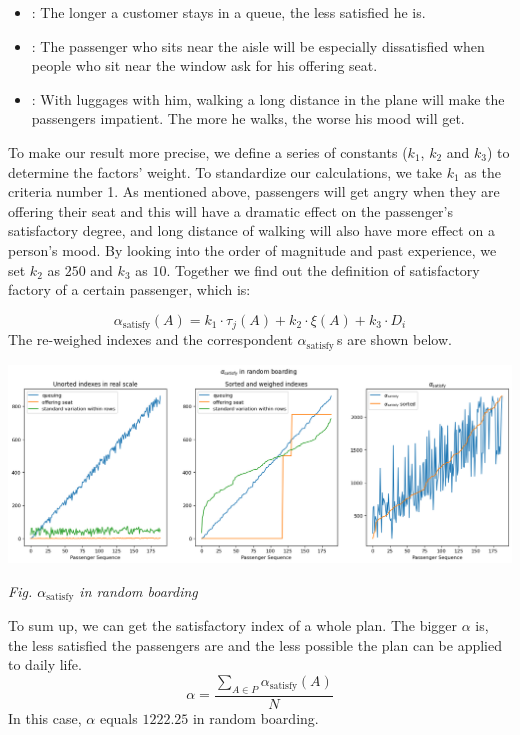 \documentclass{article}
\theoremstyle{definition}
\theoremstyle{remark}
\numberwithin{equation}{section}
\begin{document}
	\begin{itemize}
		\item {}: The longer a customer stays in a queue, the less satisfied he is.
		\item {}: The passenger who sits near the aisle will be especially dissatisfied when people who sit near the window ask for his offering seat.
		\item {}: With luggages with him, walking a long distance in the plane will make the passengers impatient. The more he walks, the worse his mood will get.
	\end{itemize}
	To make our result more precise, we define a series of constants ($k_1$, $k_2$ and $k_3$) to determine the factors' weight. To standardize our calculations, we take $k_1$ as the criteria number 1. As mentioned above, passengers will get angry when they are offering their seat and this will have a dramatic effect on the passenger's satisfactory degree, and long distance of walking will also have more effect on a person's mood. By looking into the order of magnitude and past experience, we set \(k_2\) as \(250\) and \(k_3\) as \(10\).
	Together we find out the definition of satisfactory factory of a certain passenger, which is:

	$$\alpha_\text{satisfy}(A)=k_1\cdot \tau_j(A)+k_2\cdot\xi\left(A\right)+k_3\cdot D_i$$
	The re-weighed indexes and the correspondent \(\alpha_{\mathrm{satisfy}}\,\)s are shown below.
	\begin{center}
		\includegraphics[width = 17cm]{random satis.png}

		\small\textit{Fig. \(\alpha_{\mathrm{satisfy}}\) in random boarding}
	\end{center}
	To sum up, we can get the satisfactory index of a whole plan. The bigger $\alpha$ is, the less satisfied the passengers are and the less possible the plan can be applied to daily life.
	$$\alpha=\dfrac{\sum\limits_{A\in P} \alpha_\text{satisfy}(A)}{N}$$
	In this case, \(\alpha\) equals \(1222.25\) in random boarding.
\end{document}
